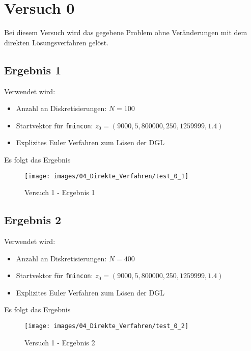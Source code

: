 \newpage
\section{Versuch 0}\label{kap:Versuch0}
Bei diesem Versuch wird das gegebene Problem ohne Veränderungen mit dem direkten Lösungsverfahren gelöst.

\subsection{Ergebnis 1}\label{kap:Versuch01}
Verwendet wird:
\begin{itemize}
\item Anzahl an Diskretisierungen: $N = 100$ 
\item Startvektor für \texttt{fmincon}: $z_0 = (9000,5,800000,250,1259999,1.4)$
\item Explizites Euler Verfahren zum Lösen der DGL
\end{itemize}
Es folgt das Ergebnis
\begin{figure}[H]
\begin{center}
\texttt{[image: images/04\_Direkte\_Verfahren/test\_0\_1]}
\caption{Versuch 1 - Ergebnis 1}\label{img:test_0_1}
\end{center}
\end{figure}

\newpage
\subsection{Ergebnis 2}\label{kap:Versuch02}
Verwendet wird:
\begin{itemize}
\item Anzahl an Diskretisierungen: $N = 400$ 
\item Startvektor für \texttt{fmincon}: $z_0 = (9000,5,800000,250,1259999,1.4)$
\item Explizites Euler Verfahren zum Lösen der DGL
\end{itemize}
Es folgt das Ergebnis
\begin{figure}[H]
\begin{center}
\texttt{[image: images/04\_Direkte\_Verfahren/test\_0\_2]}
\caption{Versuch 1 - Ergebnis 2}\label{img:test_0_2}
\end{center}
\end{figure}














